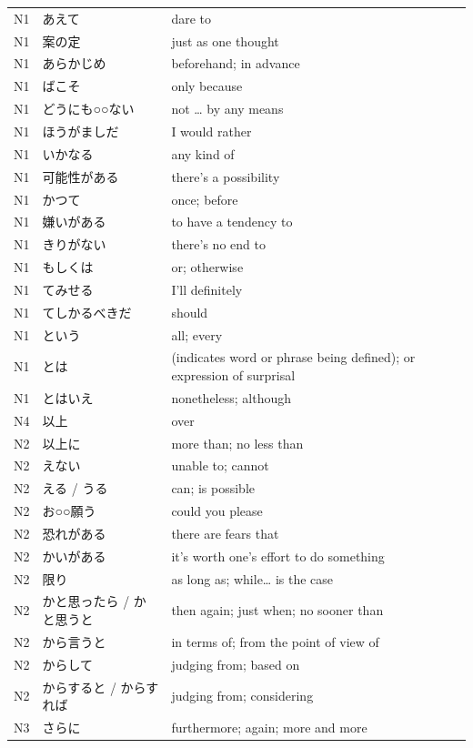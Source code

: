 \begin{longtable}{p{2cm} p{4cm} p{8cm}}
N1  &	あえて &	        dare to \\
N1  &	案の定 &	        just as one thought\\
N1  &	あらかじめ   &	beforehand; in advance\\
N1  &	ばこそ &	        only because\\
N1  &	どうにも○○ない    &	not … by any means\\
N1  &	ほうがましだ  &	I would rather\\
N1  &	いかなる	&       any kind of\\
N1	&   可能性がある  &	there's a possibility\\
N1	&   かつて	&       once; before\\
N1	&   嫌いがある &     	to have a tendency to\\
N1	&   きりがない	&   there's no end to\\
N1	&   もしくは	    &   or; otherwise\\
N1	&   てみせる	    &   I'll definitely\\
N1	&   てしかるべきだ & 	should\\
N1	&   という     &   	all; every\\
N1	&   とは	    &       (indicates word or phrase being defined); or expression of surprisal\\
N1  &	とはいえ	&       nonetheless; although\\
N4	&   以上  	&       over\\
N2	&   以上に	&       more than; no less than\\
N2	&   えない    &     	unable to; cannot\\
N2	&   える / うる &	can; is possible\\
N2	&   お○○願う &     	could you please\\
N2	&   恐れがある &     	there are fears that\\
N2	&   かいがある &     	it's worth one's effort to do something\\
N2	&   限り	        &   as long as; while… is the case\\
N2	&   かと思ったら / かと思うと	& then again; just when; no sooner than\\
N2	&   から言うと   &	in terms of; from the point of view of\\
N2	&   からして	&   judging from; based on\\
N2	&   からすると / からすれば	&   judging from; considering\\
N3	&   さらに    &   	furthermore; again; more and more\\

\end{longtable}
